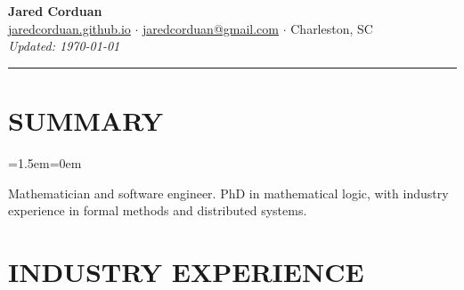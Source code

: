 \documentclass[11pt,letterpaper]{article}
\newenvironment{indentblock}{\begin{list}{}{\leftmargin=1.5em\rightmargin=0em}\item[]}{\end{list}}
\begin{document}
\begin{center}
  {\selectfont\LARGE\bfseries Jared Corduan} \\[4pt]
  \href{https://jaredcorduan.github.io}{jaredcorduan.github.io} $\cdot$
  \href{mailto:jaredcorduan@gmail.com}{jaredcorduan@gmail.com} $\cdot$
  Charleston, SC \\[2pt]
  {\scriptsize\color{gray}\textit{Updated: \today}}
\end{center}

\vspace{-4pt}
\noindent\rule{\textwidth}{0.4pt}

\section{SUMMARY}
\begin{indentblock}
Mathematician and software engineer. PhD in mathematical logic, with industry experience in formal methods and distributed systems.
\end{indentblock}

\section{INDUSTRY EXPERIENCE}
\end{document}
